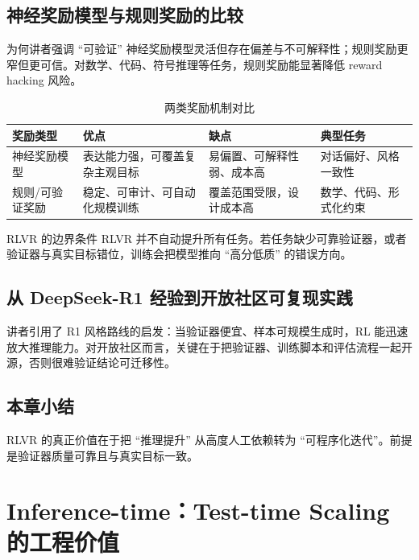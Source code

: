 \documentclass[a4paper]{article}
\begin{document}
\subsection{神经奖励模型与规则奖励的比较}
\begin{knowledgebox}{为何讲者强调 ``可验证''}
神经奖励模型灵活但存在偏差与不可解释性；规则奖励更窄但更可信。对数学、代码、符号推理等任务，规则奖励能显著降低 reward hacking 风险。
\end{knowledgebox}

\begin{table}[H]
\centering
\renewcommand{\arraystretch}{1.2}
\begin{tabular}{p{2.8cm}p{3.6cm}p{3.8cm}p{2.8cm}}
\toprule
\textbf{奖励类型} & \textbf{优点} & \textbf{缺点} & \textbf{典型任务} \\
\midrule
神经奖励模型 & 表达能力强，可覆盖复杂主观目标 & 易偏置、可解释性弱、成本高 & 对话偏好、风格一致性 \\
规则/可验证奖励 & 稳定、可审计、可自动化规模训练 & 覆盖范围受限，设计成本高 & 数学、代码、形式化约束 \\
\bottomrule
\end{tabular}
\caption{两类奖励机制对比}
\end{table}

\begin{warningbox}{RLVR 的边界条件}
RLVR 并不自动提升所有任务。若任务缺少可靠验证器，或者验证器与真实目标错位，训练会把模型推向 ``高分低质'' 的错误方向。
\end{warningbox}

\subsection{从 DeepSeek-R1 经验到开放社区可复现实践}
讲者引用了 R1 风格路线的启发：当验证器便宜、样本可规模生成时，RL 能迅速放大推理能力。对开放社区而言，关键在于把验证器、训练脚本和评估流程一起开源，否则很难验证结论可迁移性。

\subsection{本章小结}
RLVR 的真正价值在于把 ``推理提升'' 从高度人工依赖转为 ``可程序化迭代''。前提是验证器质量可靠且与真实目标一致。


\section{Inference-time：Test-time Scaling 的工程价值}
\end{document}
